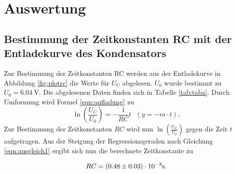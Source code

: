\section{Auswertung}
\label{sec:Auswertung}
\subsection{Bestimmung der Zeitkonstanten RC mit der Entladekurve des Kondensators}
\label{sec:RC}
Zur Bestimmung der Zeitkonstanten RC werden aus der Entladekurve in Abbildung \ref{fig:plotrc} die Werte für $U_\text{C}$ abgelesen.
$U_\text{0}$ wurde bestimmt zu $U_\text{0}=\SI{6.04}{\volt}$.
Die abgelesenen Daten finden sich in Tabelle \ref{tab:taba}.
Durch Umformung wird Formel \eqref{eqn:aufladung} zu
\begin{equation}
	\label{eqn:ausgleich1}
	\ln\left(\frac{U_\text{C}}{U_\text{0}}\right)=-\frac{1}{RC}t \,\,\,\, (y = -m \cdot t).
\end{equation}
Zur Bestimmung der Zeitkonstanten $RC$ wird nun $\ln\left(\frac{U_\text{C}}{U_\text{0}}\right)$ gegen die Zeit $t$ aufgetragen.
Aus der Steigung der Regressionsgeraden nach Gleichung \eqref{eqn:ausgleich1} ergibt sich nun die berechnete Zeitkonstante zu

\begin{equation*}
	\centering
	RC = (0.48 \pm 0.03) \cdot 10^{-3} \si{\second} .
\end{equation*}

